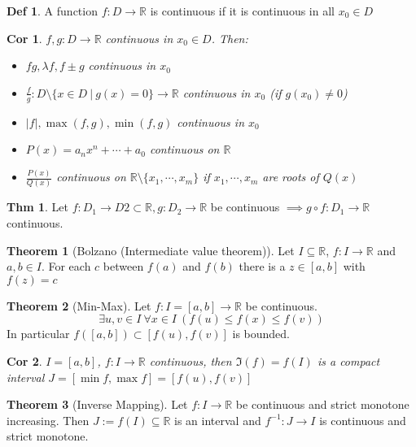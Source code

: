 \documentclass[a4paper, 10pt]{article}
\newtheorem*{corollary}{Cor}
\theoremstyle{definition}
\newtheorem*{theorem}{Thm}
\newtheorem*{definition}{Def}
\theoremstyle{named}
\newtheorem*{ntheorem_wrapper}{Theorem}
\newenvironment{ntheorem}%
    {\begin{mdframed}[style=important]\begin{ntheorem_wrapper}}%
    {\end{ntheorem_wrapper}\end{mdframed}}
\newcommand{\R}{\mathbb{R}}
\begin{document}
\begin{definition}
    A function $f: D \to \R$ is continuous if it is continuous in all $x_0 \in D$
\end{definition}

\begin{corollary}
    $f, g: D \to \R$ continuous in $x_0 \in D$. Then:
    \begin{itemize}
        \item $fg, \lambda f, f \pm g$ continuous in $x_0$
        \item $\frac{f}{g}: D \setminus \{x \in D \ | \ g(x) = 0\} \to \R$ continuous in $x_0$ (if $g(x_0) \neq 0$)
        \item $|f|, \max(f, g), \min(f, g)$ continuous in $x_0$
        \item $P(x) = a_n x^n + \cdots + a_0$ continuous on $\R$
        \item $\frac{P(x)}{Q(x)}$ continuous on $\R \setminus \{x_1, \cdots, x_m\}$ if $x_1, \cdots, x_m$ are roots of $Q(x)$
    \end{itemize}
\end{corollary}

\begin{theorem}
    Let $f: D_1 \to D2 \subset \R, g: D_2 \to \R$ be continuous $\implies g \circ f : D_1 \to \R$ continuous.
\end{theorem}

\begin{ntheorem}[Bolzano (Intermediate value theorem)]
    Let $I \subseteq \R$, $f : I \to \R$ and $a, b \in I$. For each $c$ between $f(a)$ and $f(b)$ there is a $z \in [a, b]$ with $f(z) = c$
\end{ntheorem}

\begin{ntheorem}[Min-Max]
    Let $f: I = [a, b] \to \R$ be continuous.
    $$\exists u, v \in I \ \forall x \in I \ (f(u) \leq f(x) \leq f(v))$$
    In particular $f([a, b]) \subset [f(u), f(v)]$ is bounded.
\end{ntheorem}

\begin{corollary}
    $I = [a, b]$, $f: I \to \R$ continuous, then $\Im(f) = f(I)$ is a compact interval $J = [\min f, \max f] = [f(u), f(v)]$
\end{corollary}

\begin{ntheorem}[Inverse Mapping]
    Let $f: I \to \R$ be continuous and strict monotone increasing. Then $J := f(I) \subseteq \R$ is an interval and $f^{-1}: J \to I$ is continuous and strict monotone.
\end{ntheorem}
\end{document}
